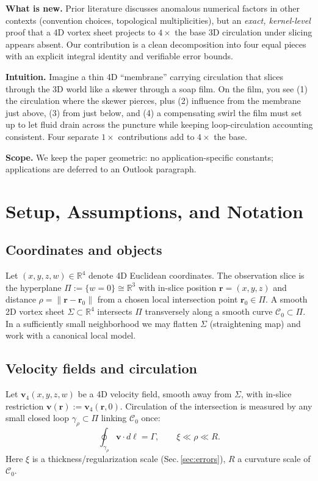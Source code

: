 \documentclass[11pt]{article}
\begin{document}
\textbf{What is new.} Prior literature discusses anomalous numerical factors in other contexts (convention choices, topological multiplicities), but an \emph{exact, kernel-level} proof that a 4D vortex sheet projects to $4\times$ the base 3D circulation under slicing appears absent. Our contribution is a clean decomposition into four equal pieces with an explicit integral identity and verifiable error bounds.

\textbf{Intuition.} Imagine a thin 4D ``membrane'' carrying circulation that slices through the 3D world like a skewer through a soap film. On the film, you see (1) the circulation where the skewer pierces, plus (2) influence from the membrane just above, (3) from just below, and (4) a compensating swirl the film must set up to let fluid drain across the puncture while keeping loop-circulation accounting consistent. Four separate $1\times$ contributions add to $4\times$ the base.

\textbf{Scope.} We keep the paper geometric: no application-specific constants; applications are deferred to an Outlook paragraph.

\section{Setup, Assumptions, and Notation}
\subsection{Coordinates and objects}
Let $(x,y,z,w)\in\mathbb R^4$ denote 4D Euclidean coordinates. The observation slice is the hyperplane $\Pi:=\{w=0\}\cong\mathbb R^3$ with in-slice position $\bm r=(x,y,z)$ and distance $\rho=\|\bm r-\bm r_0\|$ from a chosen local intersection point $\bm r_0\in\Pi$. A smooth 2D vortex sheet $\Sigma\subset\mathbb R^4$ intersects $\Pi$ transversely along a smooth curve $\mathcal C_0\subset\Pi$. In a sufficiently small neighborhood we may flatten $\Sigma$ (straightening map) and work with a canonical local model.

\subsection{Velocity fields and circulation}
Let $\bm v_4(x,y,z,w)$ be a 4D velocity field, smooth away from $\Sigma$, with in-slice restriction $\bm v(\bm r):=\bm v_4(\bm r,0)$. Circulation of the intersection is measured by any small closed loop $\gamma_\rho\subset\Pi$ linking $\mathcal C_0$ once:
\[
\oint_{\gamma_\rho} \bm v\cdot d\bm\ell = \Gamma,\qquad \xi\ll\rho\ll R.
\]
Here $\xi$ is a thickness/regularization scale (Sec.\,\ref{sec:errors}), $R$ a curvature scale of $\mathcal C_0$.
\end{document}
